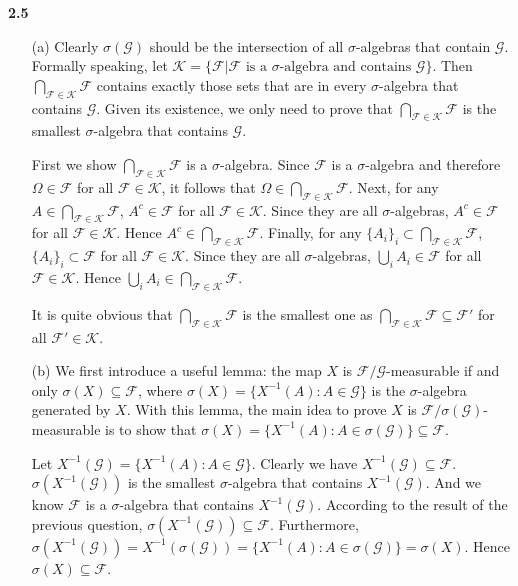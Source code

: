 \noindent\textbf{2.5}
\begin{enumerate}
    \item[(a)] Clearly $\sigma(\mathcal{G})$ should be the intersection of all $\sigma$-algebras that contain $\mathcal{G}$. Formally speaking, let $\mathcal{K} = \{\mathcal{F} | \mathcal{F} \mbox{ is a }\sigma\mbox{-algebra and contains } \mathcal{G}\}$. Then $\bigcap_{\mathcal{F} \in \mathcal{K}}\mathcal{F}$ contains exactly those sets that are in every $\sigma$-algebra that contains $\mathcal{G}$. Given its existence, we only need to prove that $\bigcap_{\mathcal{F} \in \mathcal{K}}\mathcal{F}$ is the smallest $\sigma$-algebra that contains $\mathcal{G}$.

    First we show $\bigcap_{\mathcal{F} \in \mathcal{K}}\mathcal{F}$ is a $\sigma$-algebra. Since $\mathcal{F}$ is a $\sigma$-algebra and therefore $\Omega \in \mathcal{F}$ for all $\mathcal{F} \in \mathcal{K}$, it follows that $\Omega \in \bigcap_{\mathcal{F} \in \mathcal{K}}\mathcal{F}$. Next, for any $A \in \bigcap_{\mathcal{F} \in \mathcal{K}}\mathcal{F}$, $A^c \in \mathcal{F}$ for all $\mathcal{F} \in \mathcal{K}$. Since they are all $\sigma$-algebras, $A^c \in \mathcal{F}$ for all $\mathcal{F} \in \mathcal{K}$. Hence $A^c \in \bigcap_{\mathcal{F} \in \mathcal{K}}\mathcal{F}$. Finally, for any $\{A_i\}_i \subset \bigcap_{\mathcal{F} \in \mathcal{K}}\mathcal{F}$, $\{A_i\}_i \subset \mathcal{F}$ for all $\mathcal{F} \in \mathcal{K}$. Since they are all $\sigma$-algebras, $\bigcup_i A_i \in \mathcal{F}$ for all $\mathcal{F} \in \mathcal{K}$. Hence $\bigcup_i A_i \in \bigcap_{\mathcal{F} \in \mathcal{K}}\mathcal{F}$.

    It is quite obvious that $\bigcap_{\mathcal{F} \in \mathcal{K}}\mathcal{F}$ is the smallest one as $\bigcap_{\mathcal{F} \in \mathcal{K}}\mathcal{F} \subseteq \mathcal{F}'$ for all $\mathcal{F}' \in \mathcal{K}$.

    \item[(b)] We first introduce a useful lemma: the map $X$ is $\mathcal{F} / \mathcal{G}$-measurable if and only $\sigma(X) \subseteq \mathcal{F}$, where $\sigma(X) = \{X^{-1}(A): A \in \mathcal{G}\}$ is the $\sigma$-algebra generated by $X$. With this lemma, the main idea to prove $X$ is $\mathcal{F} / \sigma(\mathcal{G})$-measurable is to show that $\sigma(X) = \{X^{-1}(A): A \in \sigma(\mathcal{G})\} \subseteq \mathcal{F}$.

    Let $X^{-1}(\mathcal{G}) = \{X^{-1}(A): A \in \mathcal{G}\}$. Clearly we have $X^{-1}(\mathcal{G}) \subseteq \mathcal{F}$. $\sigma(X^{-1}(\mathcal{G}))$ is the smallest $\sigma$-algebra that contains $X^{-1}(\mathcal{G})$. And we know $\mathcal{F}$ is a $\sigma$-algebra that contains $X^{-1}(\mathcal{G})$. According to the result of the previous question, $\sigma(X^{-1}(\mathcal{G})) \subseteq \mathcal{F}$. Furthermore, $\sigma(X^{-1}(\mathcal{G})) = X^{-1}(\sigma(\mathcal{G})) = \{X^{-1}(A): A \in \sigma(\mathcal{G})\} = \sigma(X)$. Hence $\sigma(X) \subseteq \mathcal{F}$.


\end{enumerate}
